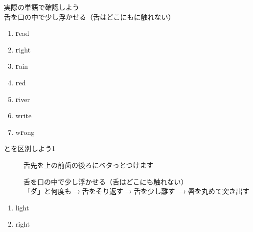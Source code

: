 \documentclass[aspectratio=169,xcolor={dvipsnames,table}]{beamer}
\begin{document}
\begin{frame}[plain]{実際の単語で確認しよう }
\hspace{20pt}舌を口の中で少し浮かせる（舌はどこにもに触れない）%
\hfill{\scriptsize {}}
\LARGE
\begin{enumerate}
 \item \textcolor{NavyBlue}{\bfseries r}ead%
\hfill{}\hspace{150pt}\mbox{}
 \item \textcolor{NavyBlue}{\bfseries r}ight
\hfill{}\hspace{150pt}\mbox{}
 \item \textcolor{NavyBlue}{\bfseries r}ain
\hfill{}\hspace{150pt}\mbox{}
 \item \textcolor{NavyBlue}{\bfseries r}ed
\hfill{}\hspace{150pt}\mbox{}
 \item \textcolor{NavyBlue}{\bfseries r}iver
\hfill{}\hspace{150pt}\mbox{}
\item w\textcolor{NavyBlue}{\bfseries r}ite
\hfill{}\hspace{150pt}\mbox{}
\item w\textcolor{NavyBlue}{\bfseries r}ong
\hfill{}\hspace{150pt}\mbox{}
\end{enumerate}
\end{frame}
\begin{frame}[plain]{とを区別しよう1}

\begin{description}
 \item[] 舌先を上の前歯の後ろにベタっとつけます
 \item[] 舌を口の中で少し浮かせる（舌はどこにも触れない）\\
	    「ダ」と何度も$\rightarrow$舌をそり返す$\rightarrow$舌を少し離す%
	    $\rightarrow$唇を丸めて突き出す
\end{description}

\Large 
 \begin{enumerate}
  \item light\hfill{}\hspace{250pt}\mbox{}
  \item right\hfill{}\hspace{250pt}\mbox{}

 \end{enumerate}

\hfill{\scriptsize {}}

\end{frame}
\end{document}
